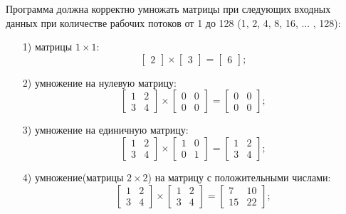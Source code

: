 \documentclass[a4paper,14pt]{article}
\begin{document}
    Программа должна корректно умножать матрицы при следующих входных данных при количестве рабочих потоков от 1 до 128 (1, 2, 4, 8, 16, ... , 128):
\\
\begin{enumerate}
	\item[1)] матрицы $1 \times 1$:
	\[ \begin{bmatrix}
2
\end{bmatrix} \times 
\begin{bmatrix}
3
\end{bmatrix} =
\begin{bmatrix}
6
\end{bmatrix}; \]

	\item[2)] умножение на нулевую матрицу:
	\[ \begin{bmatrix}
1 & 2 \\
3 & 4
\end{bmatrix} \times 
\begin{bmatrix}
0 & 0 \\
0 & 0
\end{bmatrix} =
\begin{bmatrix}
0 & 0 \\
0 & 0
\end{bmatrix}; \]

	\item[3)] умножение на единичную матрицу:
\[ \begin{bmatrix}
1 & 2 \\
3 & 4
\end{bmatrix} \times 
\begin{bmatrix}
1 & 0 \\
0 & 1
\end{bmatrix} =
\begin{bmatrix}
1 & 2 \\
3 & 4
\end{bmatrix}; \]

		\item[4)] умножение(матрицы $2 \times 2$) на матрицу с положительными числами:
\[ \begin{bmatrix}
1 & 2 \\
3 & 4
\end{bmatrix} \times 
\begin{bmatrix}
1 & 2 \\
3 & 4
\end{bmatrix} =
\begin{bmatrix}
7 & 10 \\
15 & 22
\end{bmatrix}; \]


\end{enumerate}
\end{document}
